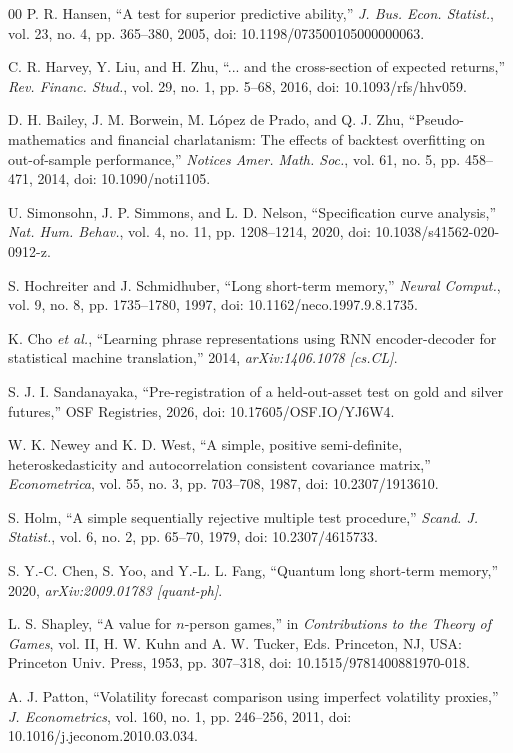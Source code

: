 \documentclass{ieeeaccess}
\begin{document}
\begin{thebibliography}{00}
P. R. Hansen, ``A test for superior predictive ability,'' \emph{J. Bus. Econ. Statist.}, vol. 23, no. 4, pp. 365--380, 2005, doi: 10.1198/073500105000000063.

C. R. Harvey, Y. Liu, and H. Zhu, ``... and the cross-section of expected returns,'' \emph{Rev. Financ. Stud.}, vol. 29, no. 1, pp. 5--68, 2016, doi: 10.1093/rfs/hhv059.

D. H. Bailey, J. M. Borwein, M. L\'opez de Prado, and Q. J. Zhu, ``Pseudo-mathematics and financial charlatanism: The effects of backtest overfitting on out-of-sample performance,'' \emph{Notices Amer. Math. Soc.}, vol. 61, no. 5, pp. 458--471, 2014, doi: 10.1090/noti1105.

U. Simonsohn, J. P. Simmons, and L. D. Nelson, ``Specification curve analysis,'' \emph{Nat. Hum. Behav.}, vol. 4, no. 11, pp. 1208--1214, 2020, doi: 10.1038/s41562-020-0912-z.

S. Hochreiter and J. Schmidhuber, ``Long short-term memory,'' \emph{Neural Comput.}, vol. 9, no. 8, pp. 1735--1780, 1997, doi: 10.1162/neco.1997.9.8.1735.

K. Cho \emph{et al.}, ``Learning phrase representations using RNN encoder-decoder for statistical machine translation,'' 2014, \emph{arXiv:1406.1078 [cs.CL]}.

S. J. I. Sandanayaka, ``Pre-registration of a held-out-asset test on gold and silver futures,'' OSF Registries, 2026, doi: 10.17605/OSF.IO/YJ6W4.

W. K. Newey and K. D. West, ``A simple, positive semi-definite, heteroskedasticity and autocorrelation consistent covariance matrix,'' \emph{Econometrica}, vol. 55, no. 3, pp. 703--708, 1987, doi: 10.2307/1913610.

S. Holm, ``A simple sequentially rejective multiple test procedure,'' \emph{Scand. J. Statist.}, vol. 6, no. 2, pp. 65--70, 1979, doi: 10.2307/4615733.

S. Y.-C. Chen, S. Yoo, and Y.-L. L. Fang, ``Quantum long short-term memory,'' 2020, \emph{arXiv:2009.01783 [quant-ph]}.

L. S. Shapley, ``A value for $n$-person games,'' in \emph{Contributions to the Theory of Games}, vol. II, H. W. Kuhn and A. W. Tucker, Eds. Princeton, NJ, USA: Princeton Univ. Press, 1953, pp. 307--318, doi: 10.1515/9781400881970-018.

A. J. Patton, ``Volatility forecast comparison using imperfect volatility proxies,'' \emph{J. Econometrics}, vol. 160, no. 1, pp. 246--256, 2011, doi: 10.1016/j.jeconom.2010.03.034.

\end{thebibliography}
\end{document}
